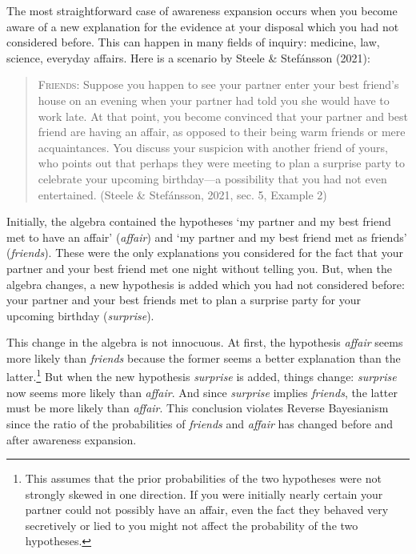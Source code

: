 \documentclass[
  11pt,
  dvipsnames,enabledeprecatedfontcommands]{scrartcl}
\begin{document}
The most straightforward case of awareness expansion occurs when you
become aware of a new explanation for the evidence at your disposal
which you had not considered before. This can happen in many fields of
inquiry: medicine, law, science, everyday affairs. Here is a scenario by
Steele \& Stefánsson (2021):

\begin{quote}
\textsc{Friends}: Suppose you happen to see your partner enter your best
friend's house on an evening when your partner had told you she would
have to work late. At that point, you become convinced that your partner
and best friend are having an affair, as opposed to their being warm
friends or mere acquaintances. You discuss your suspicion with another
friend of yours, who points out that perhaps they were meeting to plan a
surprise party to celebrate your upcoming birthday---a possibility that
you had not even entertained. (Steele \& Stefánsson, 2021, sec. 5,
Example 2)
\end{quote}

\doublespace

\noindent Initially, the algebra contained the hypotheses `my partner
and my best friend met to have an affair' (\textit{affair}) and `my
partner and my best friend met as friends' (\textit{friends}). These
were the only explanations you considered for the fact that your partner
and your best friend met one night without telling you. But, when the
algebra changes, a new hypothesis is added which you had not considered
before: your partner and your best friends met to plan a surprise party
for your upcoming birthday (\textit{surprise}).

This change in the algebra is not innocuous. At first, the hypothesis
\textit{affair} seems more likely than \textit{friends} because the
former seems a better explanation than the latter.\footnote{This assumes
  that the prior probabilities of the two hypotheses were not strongly
  skewed in one direction. If you were initially nearly certain your
  partner could not possibly have an affair, even the fact they behaved
  very secretively or lied to you might not affect the probability of
  the two hypotheses.} But when the new hypothesis \textit{surprise} is
added, things change: \textit{surprise} now seems more likely than
\textit{affair}. And since \textit{surprise} implies \textit{friends},
the latter must be more likely than \textit{affair}. This conclusion
violates Reverse Bayesianism since the ratio of the probabilities of
\textit{friends} and \textit{affair} has changed before and after
awareness expansion.
\end{document}
